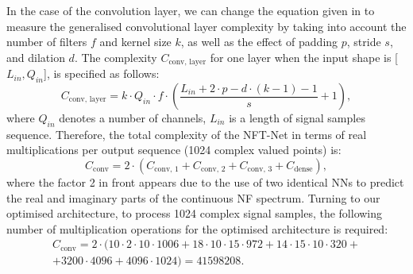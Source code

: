 In the case of the convolution layer, we can change the equation given in \cite{freire2021performance} to measure the generalised convolutional layer complexity by taking into account the number of filters $f$ and kernel size $k$, as well as the effect of padding $p$, stride $s$, and dilation $d$. The complexity $C_{\text{conv, layer}}$ for one layer when the input shape is [$L_{in},Q_{in}$], is specified as follows:
\begin{equation}
C_{\text{conv, layer}} = k \cdot Q_{in} \cdot f \cdot \left( \frac{L_{in} + 2\cdot p -d\cdot(k-1)-1}{s} +1\right) {,}
\label{eq:c_conv}
\end{equation}
where $Q_{in}$ denotes a number of channels, $L_{in}$ is a length of signal samples sequence.
Therefore, the total complexity of the NFT-Net in terms of real multiplications per output sequence (1024 complex valued points) is:
\begin{equation}
C_{\text{conv}} = 2 \cdot (C_{\text{conv, 1}}+C_{\text{conv, 2}}+C_{\text{conv, 3}}+C_{\text{dense}}) {,}
\label{eq:c_total}
\end{equation}
where the factor 2 in front appears due to the use of two identical NNs to predict the real and imaginary parts of the continuous NF spectrum. Turning to our optimised architecture, to process  1024 complex signal samples, the following number of multiplication operations for the optimised architecture is required:
\begin{eqnarray}
    C_{\text{conv}} = 2\cdot(10\cdot2\cdot10\cdot1006+ 18\cdot10\cdot15 \cdot972 + 14\cdot15\cdot10\cdot320 + \nonumber \\ 
    + 3200\cdot4096 +4096\cdot1024) = 41598208 {.}
    \label{eq:c_total_num}
\end{eqnarray}